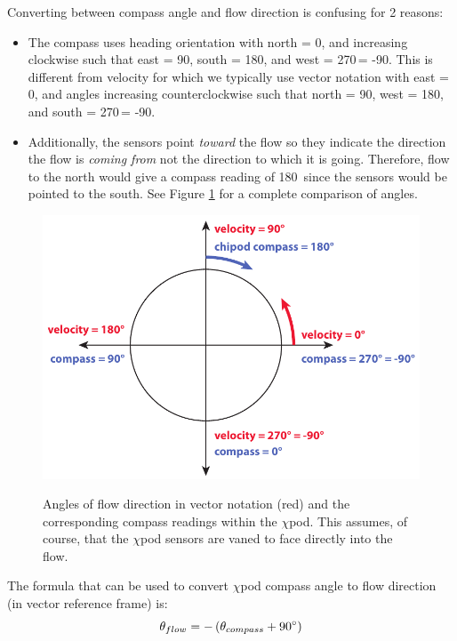 Converting between compass angle and flow direction is confusing for 2 reasons:

\begin{itemize}
\item The compass uses heading orientation with north = 0\degree, and increasing clockwise such that east = 90\degree, south = 180\degree, and west = 270\degree \,= -90\degree. This is different from velocity for which we typically use vector notation with east = 0\degree, and angles increasing counterclockwise such that north = 90\degree, west = 180\degree, and south = 270\degree \,= -90\degree.
\item Additionally, the sensors point \textit{toward} the flow so they indicate the direction the flow is \textit{coming from} not the direction to which it is going. Therefore, flow to the north would give a compass reading of 180\degree \, since the sensors would be pointed to the south. See Figure \ref{fig:cmpvelangles} for a complete comparison of angles.
\end{itemize}


\begin{figure}[h]
  \centering \centering\noindent\includegraphics[width=12cm,angle=0]{./figs/compass_and_velocity_angles.pdf}\\
    \caption{Angles of flow direction in vector notation (red) and the corresponding compass readings within the $\chi$pod. This assumes, of course, that the $\chi$pod sensors are vaned to face directly into the flow.}\label{fig:cmpvelangles}
\end{figure}

The formula that can be used to convert $\chi$pod compass angle to flow direction (in vector reference frame) is:
\begin{equation}
\theta_{flow} = -\left(\theta_{compass} + 90\degree\right)
\end{equation}

